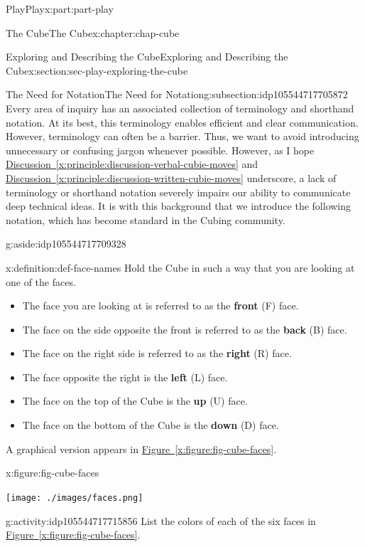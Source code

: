 \documentclass[oneside,10pt,]{book}
\newcommand{\xreffont}{\relax}
\newcommand{\terminology}[1]{\textbf{#1}}
\numberwithin{equation}{section}
\begin{document}
\begin{partptx}{Play}{}{Play}{}{}{x:part:part-play}
\begin{chapterptx}{The Cube}{}{The Cube}{}{}{x:chapter:chap-cube}
\begin{sectionptx}{Exploring and Describing the Cube}{}{Exploring and Describing the Cube}{}{}{x:section:sec-play-exploring-the-cube}
\begin{subsectionptx}{The Need for Notation}{}{The Need for Notation}{}{}{g:subsection:idp105544717705872}
Every area of inquiry has an associated collection of terminology and shorthand notation. At its best, this terminology enables efficient and clear communication. However, terminology can often be a barrier. Thus, we want to avoid introducing unnecessary or confusing jargon whenever possible. However, as I hope \hyperref[x:principle:discussion-verbal-cubie-moves]{Discussion~{\xreffont\ref{x:principle:discussion-verbal-cubie-moves}}} and \hyperref[x:principle:discussion-written-cubie-moves]{Discussion~{\xreffont\ref{x:principle:discussion-written-cubie-moves}}} underscore, a lack of terminology or shorthand notation severely impairs our ability to communicate deep technical ideas. It is with this background that we introduce the following notation, which has become standard in the Cubing community.\begin{aside}{}{g:aside:idp105544717709328}%
\end{aside}
%
\begin{definition}{}{x:definition:def-face-names}%
Hold the Cube in such a way that you are looking at one of the faces.%
\begin{itemize}[label=\textbullet]
\item{}The face you are looking at is referred to as the \terminology{front} (F) face.%
\item{}The face on the side opposite the front is referred to as the \terminology{back} (B) face.%
\item{}The face on the right side is referred to as the \terminology{right} (R) face.%
\item{}The face opposite the right is the \terminology{left} (L) face.%
\item{}The face on the top of the Cube is the \terminology{up} (U) face.%
\item{}The face on the bottom of the Cube is the \terminology{down} (D) face.%
\end{itemize}
A graphical version appears in \hyperref[x:figure:fig-cube-faces]{Figure~{\xreffont\ref{x:figure:fig-cube-faces}}}.%
\begin{figureptx}{}{x:figure:fig-cube-faces}{}%
\begin{image}{0.25}{0.5}{0.25}%
\texttt{[image: ./images/faces.png]}
\end{image}%
\tcblower
\end{figureptx}%
\end{definition}
\begin{activity}{}{g:activity:idp105544717715856}%
List the colors of each of the six faces in \hyperref[x:figure:fig-cube-faces]{Figure~{\xreffont\ref{x:figure:fig-cube-faces}}}.%

\end{activity}
\end{subsectionptx}
\end{sectionptx}
\end{chapterptx}
\end{partptx}
\end{document}
